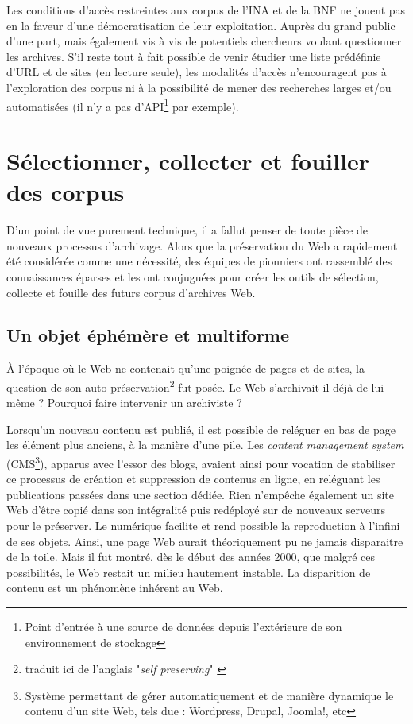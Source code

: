 \documentclass[symmetric,justified,marginals=raggedouter]{tufte-book}
\begin{document}
\noindent Les conditions d'accès restreintes aux corpus de l'INA et de la BNF ne jouent pas en la faveur d'une démocratisation de leur exploitation. Auprès du grand public d'une part, mais également vis à vis de potentiels chercheurs voulant questionner les archives. S'il reste tout à fait possible de venir étudier une liste prédéfinie d'URL et de sites (en lecture seule), les modalités d'accès n'encouragent pas à l'exploration des corpus ni à la possibilité de mener des recherches larges et/ou automatisées (il n'y a pas d'API\footnote{Point d'entrée à une source de données depuis l'extérieure de son environnement de stockage} par exemple). 

\section{Sélectionner, collecter et fouiller des corpus}
\label{sec:3_constituer}

\noindent D'un point de vue purement technique, il a fallut penser de toute pièce de nouveaux processus d'archivage. Alors que la préservation du Web a rapidement été considérée comme une nécessité, des équipes de pionniers ont rassemblé des connaissances éparses et les ont conjuguées pour créer les outils de sélection, collecte et fouille des futurs corpus d'archives Web. 

\subsection{Un objet éphémère et multiforme}  
 
\noindent À l'époque où le Web ne contenait qu'une poignée de pages et de sites, la question de son auto-préservation\footnote{traduit ici de l'anglais "\textit{self preserving}" \citep{spinellis_decay_2003}} fut posée. Le Web s'archivait-il déjà de lui même ? Pourquoi faire intervenir un archiviste ?

Lorsqu'un nouveau contenu est publié, il est possible de reléguer en bas de page les élément plus anciens, à la manière d'une pile. Les \textit{content management system} (CMS\footnote{Système permettant de gérer automatiquement et de manière dynamique le contenu d'un site Web, tels due : Wordpress, Drupal, Joomla!, etc}), apparus avec l'essor des blogs, avaient ainsi pour vocation de stabiliser ce processus de création et suppression de contenus en ligne, en reléguant les publications passées dans une section dédiée. Rien n'empêche également un site Web d'être copié dans son intégralité puis redéployé sur de nouveaux serveurs pour le préserver. Le numérique facilite et rend possible la reproduction à l'infini de ses objets. Ainsi, une page Web aurait théoriquement pu ne jamais disparaitre de la toile. Mais il fut montré, dès le début des années 2000, que malgré ces possibilités, le Web restait un milieu hautement instable. La disparition de contenu est un phénomène inhérent au Web. 
\end{document}
